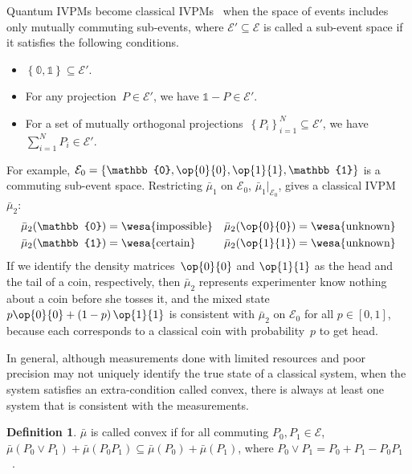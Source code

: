\documentclass[english,reprint, aps, prl,superscriptaddress, showpacs,
showkeys, longbibliography, amsmath, amssymb]{revtex4-1}
\theoremstyle{plain}
\theoremstyle{definition}
\newtheorem{definition}[thm]{Definition}
\newcommand{\events}{\ensuremath{\mathcal{E}}}
\newcommand{\imposs}{{\text{\wesa{impossible}}}}
\newcommand{\necess}{{\text{\wesa{certain}}}}
\newcommand{\unknown}{{\text{\wesa{unknown}}}}
\newcommand{\proj}[1]{\op{#1}{#1}}
\begin{document}
Quantum IVPMs become classical IVPMs~\cite{JamisonLodwick2004} when
the space of events includes only mutually commuting sub-events, where
$\events'\subseteq\events$ is called a sub-event space if it satisfies
the following conditions.
\begin{itemize}
\item $\left\{ \mathbb{0},\mathbb{1}\right\} \subseteq\events'$.
\item For any projection~$P\in\events'$, we have $\mathbb{1}-P\in\events'$. 
\item For a set of mutually orthogonal projections~$\left\{ P_{i}\right\} _{i=1}^{N}\subseteq\events'$,
we have $\sum_{i=1}^{N}P_{i}\in\events'$. 
\end{itemize}
For example, $\events_{0}=\left\{ \mathbb{0},\proj{0},\proj{1},\mathbb{1}\right\} $
is a commuting sub-event space. Restricting $\bar{\mu}_{1}$ on $\events_{0}$,
$\bar{\mu}_{1}|_{\events_{0}}$, gives a classical IVPM~$\bar{\mu}_{2}$:
\begin{equation}
\begin{aligned}\bar{\mu}_{2}(\mathbb{0}) & =\imposs & \bar{\mu}_{2}(\proj{0}) & =\unknown\\
\bar{\mu}_{2}(\mathbb{1}) & =\necess & \bar{\mu}_{2}(\proj{1}) & =\unknown
\end{aligned}
\end{equation}
If we identify the density matrices~$\proj{0}$ and $\proj{1}$ as
the head and the tail of a coin, respectively, then $\bar{\mu}_{2}$
represents experimenter know nothing about a coin before she tosses
it, and the mixed state~$p\proj{0}+\left(1-p\right)\proj{1}$ is
consistent with $\bar{\mu}_{2}$ on $\events_{0}$ for all $p\in\left[0,1\right]$,
because each corresponds to a classical coin with probability~$p$
to get head.

In general, although measurements done with limited resources and
poor precision may not uniquely identify the true state of a classical
system, when the system satisfies an extra-condition called convex,
there is always at least one system that is consistent with the measurements.

\begin{definition}
$\bar{\mu}$ is called convex if for all commuting $P_{0},P_{1}\in\events$,
$\bar{\mu}\left(P_{0}\vee P_{1}\right)+\bar{\mu}\left(P_{0}P_{1}\right)\subseteq\bar{\mu}\left(P_{0}\right)+\bar{\mu}\left(P_{1}\right)$,
where $P_{0}\vee P_{1}=P_{0}+P_{1}-P_{0}P_{1}$~\cite{Griffiths2003}.
\end{definition}
\end{document}
